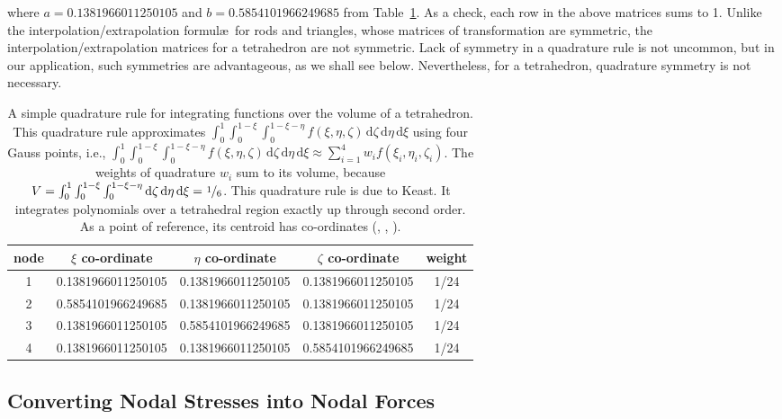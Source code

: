 where $a = 0.1381966011250105$ and $b = 0.5854101966249685$ from Table~\ref{tab:4nodedTet}.  As a check, each row in the above matrices sums to 1.  Unlike the interpolation\slash extrapolation formul\ae\ for rods and triangles, whose matrices of transformation are symmetric, the interpolation\slash extrapolation matrices for a tetrahedron are not symmetric.  Lack of symmetry in a quadrature rule is not uncommon, but in our application, such symmetries are advantageous, as we shall see below.  Nevertheless, for a tetrahedron, quadrature symmetry is not necessary.
    
\begin{table}
    \small
    \begin{tabular}{|c|cccc|}
        \hline
        node & $\xi$ co-ordinate & $\eta$ co-ordinate & 
        $\zeta$ co-ordinate & weight \\ \hline        
        1 & 0.1381966011250105 & 0.1381966011250105 & 0.1381966011250105 & 1/24 \\
        2 & 0.5854101966249685 & 0.1381966011250105 & 0.1381966011250105 & 1/24 \\
        3 & 0.1381966011250105 & 0.5854101966249685 & 0.1381966011250105 & 1/24 \\
        4 & 0.1381966011250105 & 0.1381966011250105 & 0.5854101966249685 & 1/24 \\
        \hline
    \end{tabular}
    \normalsize
    \caption{A simple quadrature rule for integrating functions over the volume of a tetrahedron.  This quadrature rule approximates $\int_0^1 \int_0^{1-\xi} \int_0^{1-\xi-\eta} f(\xi, \eta, \zeta) \, \mathrm{d}\zeta \, \mathrm{d}\eta \, \mathrm{d}\xi$ using four Gauss points, i.e., $\int_0^1 \int_0^{1-\xi} \int_0^{1-\xi-\eta} f(\xi, \eta, \zeta) \, \mathrm{d}\zeta \, \mathrm{d}\eta \, \mathrm{d}\xi \approx \sum_{i=1}^4 w_i f( \xi_i , \eta_i , \zeta_i )$.  The weights of quadrature $w_i$ sum to its volume, because $V = \int_0^1 \int_0^{1-\xi} \int_0^{1-\xi-\eta} \mathrm{d}\zeta \, \mathrm{d}\eta \, \mathrm{d}\xi = \textfrac{1}{6}$.  This quadrature rule is due to Keast.  It integrates polynomials over a tetrahedral region exactly up through second order.  As a point of reference, its centroid has co-ordinates (, , ).}
    \label{tab:4nodedTet}
\end{table}


\subsection{Converting Nodal Stresses into Nodal Forces}


